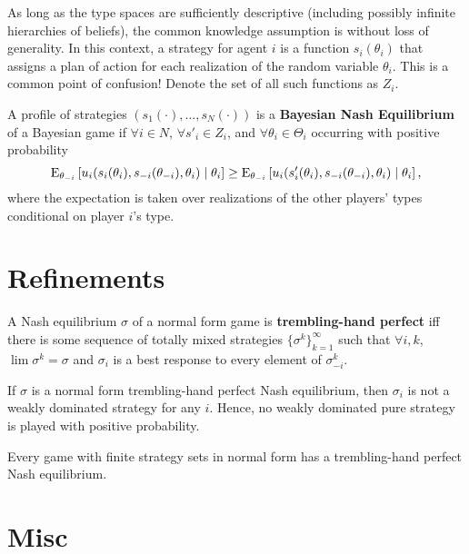 \documentclass[10pt]{article}
\begin{document}
\begin{spacing}{1.0}
As long as the type spaces are sufficiently descriptive (including possibly
infinite hierarchies of beliefs), the common knowledge assumption is
without loss of generality. In this context, a strategy for agent $i$ is a
function $s_i(\theta_i)$ that assigns a plan of action for each realization
of the random variable $\theta_i$. This is a common point of confusion!
Denote the set of all such functions as $Z_i$.

\begin{definition}
  A profile of strategies $(s_1(\cdot), \ldots, s_N(\cdot))$ is a
  \textbf{Bayesian Nash Equilibrium} of a Bayesian game if $\forall i \in N$, $\forall s'_i \in Z_i$, and $\forall \theta_i
  \in \Theta_i$ occurring with positive
  probability \[\operatorname{E}_{\theta_{-i}}\left[u_i(s_i(\theta_i), s_{-i}(\theta_{-i}),
    \theta_i) \;|\; \theta_i \right] \geq \operatorname{E}_{\theta_{-i}}\left[u_i(s'_i(\theta_i), s_{-i}(\theta_{-i}),
    \theta_i) \;|\; \theta_i \right], \] where the expectation is taken over
  realizations of the other players' types conditional on player $i$'s type.
\end{definition}

\section{Refinements}

\begin{definition}
  A Nash equilibrium $\sigma$ of a normal form game is
  \textbf{trembling-hand perfect} iff there is some sequence of totally
  mixed strategies $\{\sigma^k\}_{k=1}^\infty$ such that $\forall i,k$,
  $\lim \sigma^k = \sigma$ and $\sigma_i$ is a best response to every
  element of $\sigma_{-i}^k$.
\end{definition}

\begin{lemma}
  If $\sigma$ is a normal form trembling-hand perfect Nash equilibrium, then
  $\sigma_i$ is not a weakly dominated strategy for any $i$. Hence, no weakly
  dominated pure strategy is played with positive probability.
\end{lemma}

\begin{theorem}
  Every game with finite strategy sets in normal form has a trembling-hand
  perfect Nash equilibrium.
\end{theorem}

\section{Misc}


\end{spacing}
\end{document}
